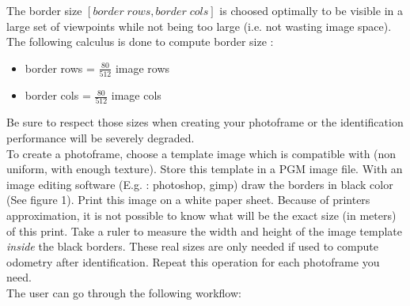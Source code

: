 \noindent The border size $\left[border \; rows, border \;
  cols\right]$ is choosed optimally to be visible in a large set of
viewpoints while not being too large (i.e. not wasting image space).
The following calculus is done to compute border size :

\begin{itemize}
\item border rows = $\frac{80}{512}$ image rows
\item border cols = $\frac{80}{512}$ image cols
\end{itemize}

\noindent Be sure to respect those sizes when creating your photoframe or the
identification performance will be severely degraded.\\

\noindent To create a photoframe, choose a template image which is compatible
with \rox{} (non uniform, with enough texture). Store this template in
a PGM image file. With an image editing software (E.g. : photoshop,
gimp) draw the borders in black color (See figure 1). Print this image
on a white paper sheet. Because of printers approximation, it is not
possible to know what will be the exact size (in meters) of this
print.  Take a ruler to measure the width and height of the image
template \emph{inside} the black borders. These real sizes are only
needed if used to compute odometry after identification. Repeat this
operation for each photoframe you need.\\

\noindent The user can go through the following workflow:

